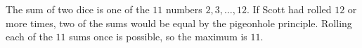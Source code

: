 The sum of two dice is one of the $11$ numbers $2,3,\dots,12$. If Scott had rolled $12$ or more times, two of the sums would be equal by the pigeonhole principle. Rolling each of the $11$ sums once is possible, so the maximum is $\boxed{11}$.
